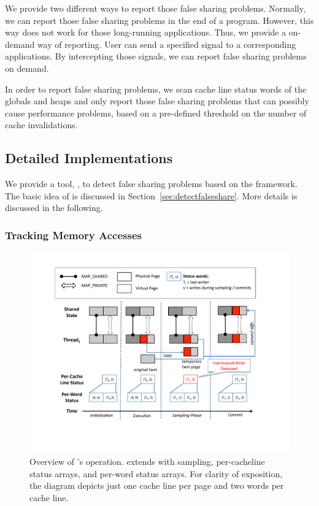 We provide two different ways to report those false sharing problems. Normally, we can report those false sharing problems in the end of a program. However, this way does not work for those long-running applications. Thus, we provide a on-demand way of reporting. User can send a specified signal to a corresponding applications. By intercepting those signals, we can report false sharing problems on demand. 

In order to report false sharing problems, we scan cache line status words of the globals and heaps and only report those false sharing problems that can possibly cause performance problems, based on a pre-defined threshold on the number of cache invalidations.  

\subsection{Detailed Implementations}

\label{sec:sheriffdetect}
We provide a tool, \SheriffDetect{}, to detect false sharing problems based on the \sheriff{} framework. The basic idea of \SheriffDetect{} is discussed in Section~\ref{sec:detectfalseshare}. More details is discussed in the following. 

\subsubsection{Tracking Memory Accesses}
\label{sec:memoryaccesses}

\begin{figure}[!t]
\centering
\includegraphics[width=5in]{sheriff/figure/sheriffdetective.pdf}
\caption{
Overview of \SheriffDetect{}’s operation. \SheriffDetect{} extends \Sheriff{} with sampling, per-cacheline status arrays, and per-word status arrays. For clarity of
exposition, the diagram depicts just one cache line per page and two words per cache line.\label{fig:sheriffdetect}}
\end{figure}

